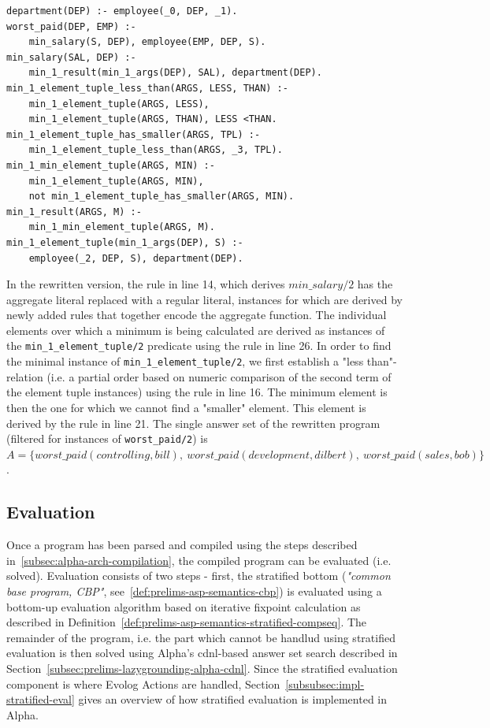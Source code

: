 \begin{example}
\begin{lstlisting}[style=asp-code, label={lst:aggregate-rewriting-min-rewritten}, caption={The program from Listing~\ref{lst:aggregate-rewriting-min-source} in its rewritten version.}]
department(DEP) :- employee(_0, DEP, _1).
worst_paid(DEP, EMP) :- 
    min_salary(S, DEP), employee(EMP, DEP, S).
min_salary(SAL, DEP) :- 
    min_1_result(min_1_args(DEP), SAL), department(DEP).
min_1_element_tuple_less_than(ARGS, LESS, THAN) :- 
    min_1_element_tuple(ARGS, LESS), 
    min_1_element_tuple(ARGS, THAN), LESS <THAN.
min_1_element_tuple_has_smaller(ARGS, TPL) :- 
    min_1_element_tuple_less_than(ARGS, _3, TPL).
min_1_min_element_tuple(ARGS, MIN) :- 
    min_1_element_tuple(ARGS, MIN), 
    not min_1_element_tuple_has_smaller(ARGS, MIN).
min_1_result(ARGS, M) :- 
    min_1_min_element_tuple(ARGS, M).
min_1_element_tuple(min_1_args(DEP), S) :- 
    employee(_2, DEP, S), department(DEP).
\end{lstlisting}   
In the rewritten version, the rule in line 14, which derives $\mathit{min\_salary/2}$ has the aggregate literal replaced with a regular literal, instances for which are derived by newly added rules that together encode the aggregate function. 
The individual elements over which a minimum is being calculated are derived as instances of the \texttt{min\_1\_element\_tuple/2} predicate using the rule in line 26. In order to find the minimal instance of \texttt{min\_1\_element\_tuple/2}, we first establish a "less than"-relation (i.e. a partial order based on numeric comparison of the second term of the element tuple instances) using the rule in line 16. The minimum element is then the one for which we cannot find a "smaller" element. This element is derived by the rule in line 21.
The single answer set of the rewritten program (filtered for instances of \texttt{worst\_paid/2}) is $A =\{worst\_paid(controlling,bill),~worst\_paid(development,dilbert),~worst\_paid(sales,bob)\}$.
\end{example}    

\subsection{Evaluation}

Once a program has been parsed and compiled using the steps described in~\ref{subsec:alpha-arch-compilation}, the compiled program can be evaluated (i.e. solved). Evaluation consists of two steps - first, the stratified bottom (\emph{"common base program, CBP"}, see~\ref{def:prelims-asp-semantics-cbp}) is evaluated using a bottom-up evaluation algorithm based on iterative fixpoint calculation as described in Definition~\ref{def:prelims-asp-semantics-stratified-compseq}. The remainder of the program, i.e. the part which cannot be handlud using stratified evaluation is then solved using Alpha's \gls{cdnl}-based answer set search described in Section~\ref{subsec:prelims-lazygrounding-alpha-cdnl}. Since the stratified evaluation component is where Evolog Actions are handled, Section~\ref{subsubsec:impl-stratified-eval} gives an overview of how stratified evaluation is implemented in Alpha.

